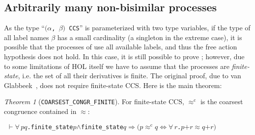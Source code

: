 \documentclass[GCNS]{yincog}
\renewcommand{\HOLinline}[1]{\mbox{\textup{\texttt{#1}}}}
\renewcommand{\HOLConst}[1]{\texttt{#1}}
\renewcommand{\HOLTyOp}[1]{\texttt{#1}}
\renewcommand{\HOLBoundVar}[1]{\ensuremath{\mathit{#1}}}
\renewcommand{\HOLSymConst}[1]{#1}
\renewcommand{\HOLTokenConj}{\ensuremath{\wedge}}
\renewcommand{\HOLTokenEquiv}{\ensuremath{\Longleftrightarrow}}
\renewcommand{\HOLTokenForall}{\ensuremath{\forall \,}}
\renewcommand{\HOLTokenTurnstile}{\ensuremath{\:\:\vdash}}
\theoremstyle{remark}
\theoremstyle{theorem}
\newtheorem{theorem}[definition]{Theorem}
\theoremstyle{remark}
\newcommand{\HOLTokenWeakEQ}{$\approx$}
\newcommand{\HOLTokenObsCongr}{$\approx^{\mathrm{c}}\!$}
\renewcommand{\HOLTokenImp}{\ensuremath{\Longrightarrow}}
\newcommand{\rapprox}{\mathrel{\approx^{\mathrm{c}}}}
\newcommand{\wbvtex}{\approx}
\begin{document}
\subsection{Arbitrarily many non-bisimilar processes}
 \label{ss:arbitrarily}

As the type ``\HOLinline{\ensuremath{(}\ensuremath{\alpha}, \ensuremath{\beta}\ensuremath{)} \HOLTyOp{CCS}}''
is parameterized with two type variables, if the type of all label names
$\beta $ has a small cardinality (a singleton in the extreme case), it
is possible that the processes of  use all
available labels, and thus the free action hypothesis does not hold. In
this case, it is still possible to prove ;
however, due to some limitations of HOL itself we have to assume that the
processes are \emph{finite-state}, i.e. the set of all their derivatives
is finite. The original proof, due to van Glabbeek~\cite{van2005characterisation},
does not require finite-state CCS. Here is the main theorem:
%
\begin{theorem}[\texttt{COARSEST\_CONGR\_FINITE}]
 \label{thm:coarsestfiniteState}
For finite-state CCS, $\rapprox $ is the coarsest congruence contained
in $\wbvtex $:
%
\begin{alltt}
\HOLTokenTurnstile{} \HOLSymConst{\HOLTokenForall{}}\HOLBoundVar{p} \HOLBoundVar{q}. \HOLConst{finite\_state} \HOLBoundVar{p} \HOLSymConst{\HOLTokenConj{}} \HOLConst{finite\_state} \HOLBoundVar{q} \HOLSymConst{\HOLTokenImp{}} \ensuremath{(}\HOLBoundVar{p} \HOLSymConst{\HOLTokenObsCongr} \HOLBoundVar{q} \HOLSymConst{\HOLTokenEquiv{}} \HOLSymConst{\HOLTokenForall{}}\HOLBoundVar{r}. \HOLBoundVar{p} \HOLSymConst{\ensuremath{+}} \HOLBoundVar{r} \HOLSymConst{\HOLTokenWeakEQ} \HOLBoundVar{q} \HOLSymConst{\ensuremath{+}} \HOLBoundVar{r}\ensuremath{)}
\end{alltt}
%
\end{theorem}
\end{document}
